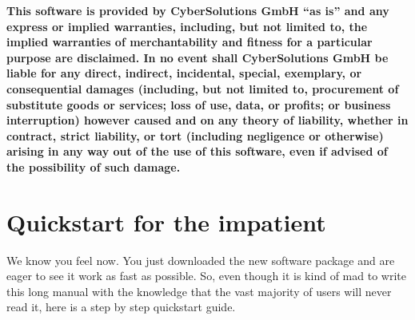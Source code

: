 \documentclass[a4paper]{report}
\begin{document}
\medskip

\noindent
{\bf This software is provided by CyberSolutions GmbH ``as is'' and
any express or implied warranties, including, but not limited to, the
implied warranties of merchantability and fitness for a particular
purpose are disclaimed. In no event shall CyberSolutions GmbH be
liable for any direct, indirect, incidental, special, exemplary, or
consequential damages (including, but not limited to, procurement of
substitute goods or services; loss of use, data, or profits; or
business interruption) however caused and on any theory of liability,
whether in contract, strict liability, or tort (including negligence
or otherwise) arising in any way out of the use of this software, even
if advised of the possibility of such damage.}

\newpage

%
%
 \setcounter{page}{1} \pagestyle{headings}
\tableofcontents
\clearpage
{} \setcounter{page}{1} \pagestyle{headings}

%
%
\chapter{Quickstart for the impatient}

We know you feel now. You just downloaded the new software
package and are eager to see it work as fast as possible. So, even
though it is kind of mad to write this long manual with the knowledge
that the vast majority of users will never read it, here is a step by
step quickstart guide.
\end{document}
